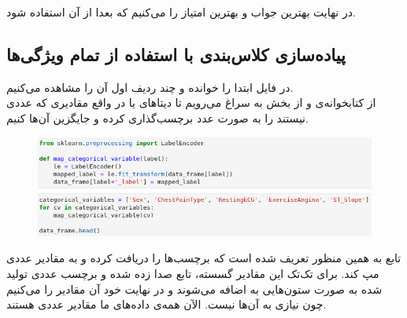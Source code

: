 \documentclass{article}
\begin{document}
\begin{multicols}{2}
در نهایت بهترین جواب و بهترین امتیاز را
می‌کنیم که بعدا از آن استفاده شود.

\subsection{
پیاده‌سازی کلاس‌بندی با استفاده از تمام ویژگی‌ها
}
در فایل
ابتدا
را خوانده و چند ردیف اول آن را مشاهده می‌کنیم.\\
از کتابخوانه‌ی
و از بخش
به سراغ
می‌رویم تا دیتاهای
یا در واقع مقادیری که عددی نیستند را به صورت عدد برچسب‌گذاری کرده و جایگزین آن‌ها کنیم.
\begin{figure}[H]
    \centering
    \includegraphics[width=0.99\linewidth]{Photos/SA/label_encoder.png}
    \caption{
    }
    \label{fig:my_label}
\end{figure}

تابع
به همین منظور تعریف شده است که برچسب‌ها را دریافت کرده و به مقادیر عددی مپ کند. برای تک‌تک این مقادیر گسسته، تابع صدا زده شده و برچسب عددی تولید شده به صورت ستون‌هایی به
اضافه می‌شوند و در نهایت خود آن مقادیر را
می‌کنیم چون نیازی به آن‌ها نیست. الآن همه‌ی داده‌های ما مقادیر عددی هستند.


\end{multicols}
\end{document}
